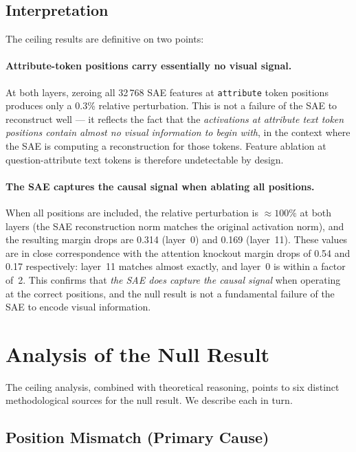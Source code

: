 \documentclass[11pt,a4paper]{article}
\begin{document}
\subsection{Interpretation}

The ceiling results are definitive on two points:

\paragraph{Attribute-token positions carry essentially no visual signal.}
At both layers, zeroing all 32\,768 SAE features at \texttt{attribute} token positions produces only
a 0.3\% relative perturbation.
This is not a failure of the SAE to reconstruct well — it reflects the fact that the
\emph{activations at attribute text token positions contain almost no visual information to begin
with}, in the context where the SAE is computing a reconstruction for those tokens.
Feature ablation at question-attribute text tokens is therefore undetectable by design.

\paragraph{The SAE captures the causal signal when ablating all positions.}
When all positions are included, the relative perturbation is $\approx 100\%$ at both layers (the
SAE reconstruction norm matches the original activation norm), and the resulting margin drops are
0.314 (layer~0) and 0.169 (layer~11).
These values are in close correspondence with the attention knockout margin drops of 0.54 and 0.17
respectively: layer~11 matches almost exactly, and layer~0 is within a factor of~2.
This confirms that \emph{the SAE does capture the causal signal} when operating at the correct
positions, and the null result is not a fundamental failure of the SAE to encode visual information.


\section{Analysis of the Null Result}
\label{sec:null}

The ceiling analysis, combined with theoretical reasoning, points to six distinct methodological
sources for the null result. We describe each in turn.

\subsection{Position Mismatch (Primary Cause)}
\end{document}
